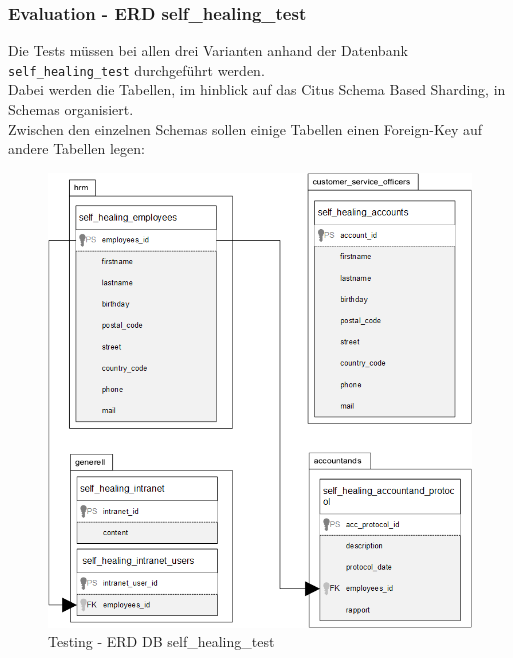 \begin{flushleft}
    \subsubsection{Evaluation - ERD self\_healing\_test}
    Die Tests müssen bei allen drei Varianten anhand der Datenbank \texttt{self\_healing\_test} durchgeführt werden.\\
    Dabei werden die Tabellen, im hinblick auf das Citus Schema Based Sharding, in Schemas organisiert.\\
    Zwischen den einzelnen Schemas sollen einige Tabellen einen Foreign-Key auf andere Tabellen legen:
    \begin{figure}[H]
        \centering
        \includegraphics[width=0.5\linewidth]{source/implementation/evaluation/evaluation_tests/erd_self_healing_test}
        \caption{Testing - ERD DB self\_healing\_test}
        \label{fig:erd_self_healing_test}
    \end{figure}
\end{flushleft}